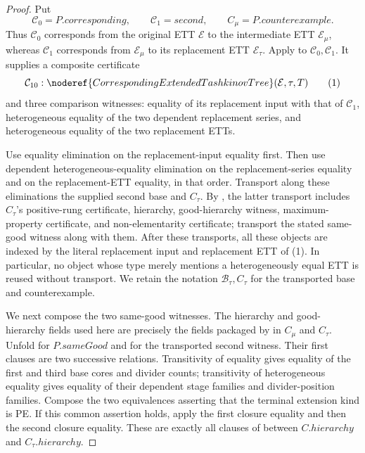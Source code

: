 \begin{proof}
Put
\[
 \mathcal C_0=P.\mathit{corresponding},\qquad
 \mathcal C_1=\mathit{second},\qquad
 C_\mu=P.\mathit{counterexample}.
\]
Thus \(\mathcal C_0\) corresponds from the original ETT \(\mathcal E\) to
the intermediate ETT \(\mathcal E_\mu\), whereas \(\mathcal C_1\)
corresponds from \(\mathcal E_\mu\) to its replacement ETT
\(\mathcal E_\tau\).  Apply
 to
\(\mathcal C_0,\mathcal C_1\).  It supplies a composite certificate
\[
 \mathcal C_{10}:
 \noderef{CorrespondingExtendedTashkinovTree}(\mathcal E,\tau,T)       \tag{1}
\]
and three comparison witnesses: equality of its replacement input with
that of \(\mathcal C_1\), heterogeneous equality of the two dependent
replacement series, and heterogeneous equality of the two replacement
ETTs.

Use equality elimination on the replacement-input equality first.  Then
use dependent heterogeneous-equality elimination on the replacement-series
equality and on the replacement-ETT equality, in that order.  Transport
along these eliminations the supplied second base and \(C_\tau\).  By
, the latter transport includes
\(C_\tau\)'s positive-rung certificate, hierarchy, good-hierarchy witness,
maximum-property certificate, and non-elementarity certificate; transport
the stated same-good witness along with them.
After these transports, all these objects are indexed by the literal
replacement input and replacement ETT of (1).  In particular, no object
whose type merely mentions a heterogeneously equal ETT is reused without
transport.  We retain the notation \(\mathcal B_\tau,C_\tau\) for the
transported base and counterexample.

We next compose the two same-good witnesses.  The hierarchy and
good-hierarchy fields used here are precisely the fields packaged by
 in \(C_\mu\) and \(C_\tau\).  Unfold
 for \(P.\mathit{sameGood}\) and for the
transported second witness.  Their first clauses are two successive
 relations.  Transitivity of equality gives
equality of the first and third base cores and divider counts;
transitivity of heterogeneous equality gives equality of their dependent
stage families and divider-position families.  Compose the two
equivalences asserting that the terminal extension kind is PE.  If this
common assertion holds, apply the first closure equality and then the
second closure equality.  These are exactly all clauses of
 between \(C.\mathit{hierarchy}\) and
\(C_\tau.\mathit{hierarchy}\).


\end{proof}
